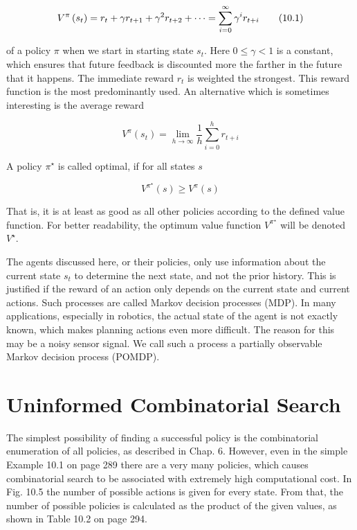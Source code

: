 \documentclass[10pt]{book}
\begin{document}
\begin{equation*}\index{BDD.!equation}
V^{\pi}\left(s_{t}\right)=r_{t}+\gamma r_{t+1}+\gamma^{2} r_{t+2}+\cdots=\sum_{i=0}^{\infty} \gamma^{i} r_{t+i} \tag{10.1}
\end{equation*}


of a policy $\pi$ when we start in starting state $s_{t}$. Here $0 \leq \gamma<1$ is a constant, which ensures that future feedback is discounted more the farther in the future that it happens. The immediate reward $r_{t}$ is weighted the strongest. This reward function is the most predominantly used. An alternative which is sometimes interesting is the average reward


\begin{equation*}
V^{\pi}\left(s_{t}\right)=\lim _{h \rightarrow \infty} \frac{1}{h} \sum_{i=0}^{h} r_{t+i} \tag{10.2}
\end{equation*}


A policy $\pi^{\star}$ is called optimal, if for all states $s$


\begin{equation*}
V^{\pi^{\star}}(s) \geq V^{\pi}(s) \tag{10.3}
\end{equation*}


That is, it is at least as good as all other policies according to the defined value function. For better readability, the optimum value function $V^{\pi^{\star}}$ will be denoted $V^{\star}$.

The agents discussed here, or their policies, only use information about the current state $s_{t}$ to determine the next state, and not the prior history. This is justified if the reward of an action only depends on the current state and current actions. Such processes are called Markov decision processes (MDP). In many applications, especially in robotics, the actual state of the agent is not exactly known, which makes planning actions even more difficult. The reason for this may be a noisy sensor signal. We call such a process a partially observable Markov decision process (POMDP).

\section{Uninformed Combinatorial Search}
The simplest possibility of finding a successful policy is the combinatorial enumeration of all policies, as described in Chap. 6. However, even in the simple Example 10.1 on page 289 there are a very many policies, which causes combinatorial search to be associated with extremely high computational cost. In Fig. 10.5 the number of possible actions is given for every state. From that, the number of possible policies is calculated as the product of the given values, as shown in Table 10.2 on page 294.
\end{document}
